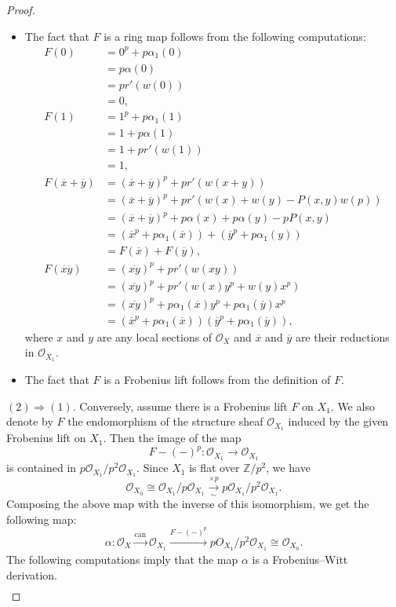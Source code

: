 \documentclass[11pt, a4paper]{amsart}
\theoremstyle{plain}
\theoremstyle{definition}
\begin{document}
\begin{proof}
\begin{itemize}
        \item The fact that $F$ is a ring map follows from the following computations: \begin{align*}
            F(0)&=0^p+p\alpha_1(0)\\&=p\alpha(0)\\&=pr'(w(0))\\&=0,\\
            F(1)&=1^p+p\alpha_1(1)\\&=1+p\alpha(1)\\&=1+pr'(w(1))\\&=1,\\
            F(\overline x+\overline y)&=(\overline x+\overline y)^p+pr'(w(x+y))\\&=(\overline x+\overline y)^p+pr'(w(x)+w(y)-P(x,y)w(p))\\&=(\overline x+\overline y)^p+p\alpha(x)+p\alpha(y)-pP(x,y)\\&=(\overline x^p+p\alpha_1(\overline x))+(\overline y^p+p\alpha_1(y))\\&=F(\overline x)+F(\overline y),\\
            F(\overline x\overline y)&=(\overline{xy})^p+pr'(w(xy))\\&=(\overline{xy})^p+pr'(w(x)y^p+w(y)x^p)\\&=(\overline{xy})^p+p\alpha_1(\overline x)y^p+p\alpha_1(\overline y)x^p\\&=(\overline x^p+p\alpha_1(\overline x))(\overline y^p+p\alpha_1(\overline y)),
        \end{align*}
        where $x$ and $y$ are any local sections of $\mathcal O_X$ and $\overline x$ and $\overline y$ are their reductions in $\mathcal O_{X_1}$. 
        \item The fact that $F$ is a Frobenius lift follows from the definition of $F$.
    \end{itemize}
$(2)\Rightarrow (1)$. Conversely, assume there is a Frobenius lift $F$ on $X_1$. We also denote by $F$ the endomorphism of the structure sheaf $\mathcal O_{X_1}$ induced by the given Frobenius lift on $X_1$. Then the image of the map \[F-(-)^p:\mathcal O_{X_1}\to \mathcal O_{X_1}\] is contained in $p\mathcal O_{X_1}/p^2\mathcal O_{X_1}$. Since $X_1$ is flat over $\mathbb Z/p^2$, we have \[\mathcal O_{X_0}\cong \mathcal O_{X_1}/p\mathcal O_{X_1}\xrightarrow[\sim]{\times p}p\mathcal O_{X_1}/p^2\mathcal O_{X_1}.\] Composing the above map with the inverse of this isomorphism, we get the following map:
\[\alpha:\mathcal O_X\xrightarrow[]{\mathrm{can}}\mathcal O_{X_1}\xrightarrow[]{F-(-)^p} pO_{X_1}/p^2\mathcal O_{X_1}\cong \mathcal O_{X_0}.\] The following computations imply that the map $\alpha$ is a Frobenius--Witt derivation.\begin{align*}

\end{align*}
\end{proof}
\end{document}
